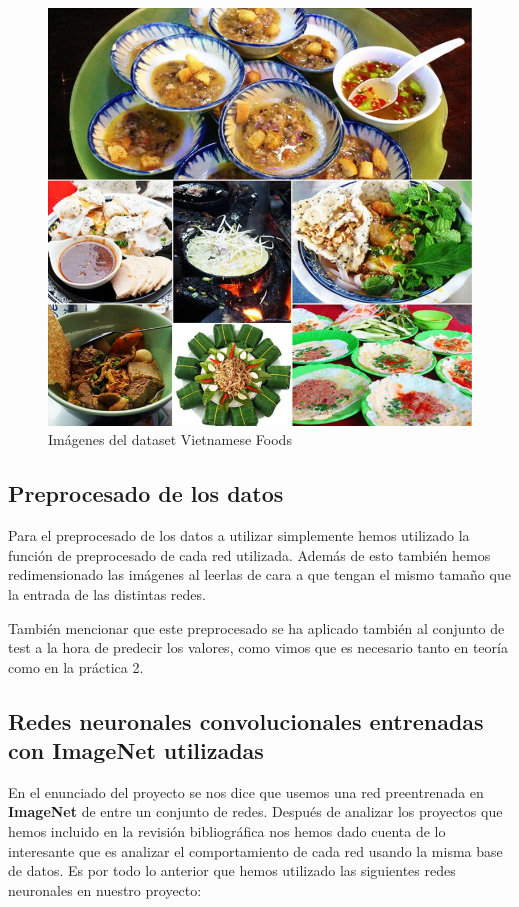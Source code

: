 \begin{figure}[H]
  \centering
  \includegraphics[width=0.5\linewidth]{Imagenes/comida-vietnamita.png}
  \caption{Imágenes del dataset Vietnamese Foods}
  \label{fig:sub-first}
\end{figure}

\newpage

\subsection{Preprocesado de los datos}

Para el preprocesado de los datos a utilizar simplemente hemos utilizado la función de preprocesado de cada red utilizada. Además de esto también hemos redimensionado las imágenes al leerlas de cara a que tengan el mismo tamaño que la entrada de las distintas redes.

También mencionar que este preprocesado se ha aplicado también al conjunto de test a la hora de predecir los valores, como vimos que es necesario tanto en teoría como en la práctica 2.


\subsection{Redes neuronales convolucionales entrenadas con ImageNet utilizadas}

\vspace{5 mm}

En el enunciado del proyecto se nos dice que usemos una red preentrenada en \textbf{ImageNet} de entre un conjunto de redes. Después de analizar los proyectos que hemos incluido en la revisión bibliográfica nos hemos dado cuenta de lo interesante que es analizar el comportamiento de cada red usando la misma base de datos. Es por todo lo anterior que hemos utilizado las siguientes redes neuronales en nuestro proyecto:

